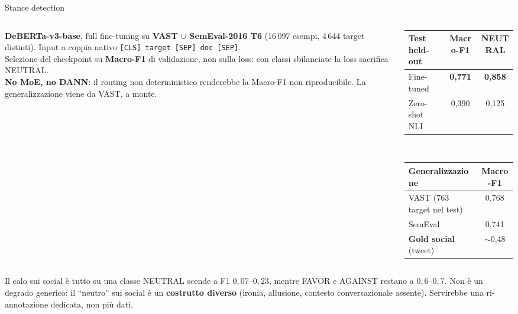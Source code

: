 \documentclass[aspectratio=169,11pt]{beamer}
\begin{document}
\begin{frame}{Stance detection}
  \begin{columns}[T]
    \begin{column}{0.5\textwidth}
      \footnotesize
      \textbf{DeBERTa-v3-base}, full fine-tuning su
      \textbf{VAST $\cup$ SemEval-2016 T6} (16\,097 esempi, \alert{4\,644 target distinti}).
      Input a coppia nativo \texttt{[CLS] target [SEP] doc [SEP]}.\\[0.4em]
      Selezione del checkpoint su \textbf{Macro-F1} di validazione, non sulla loss: con classi
      sbilanciate la loss sacrifica NEUTRAL.\\[0.4em]
      \textbf{No MoE, no DANN}: il routing non deterministico renderebbe la Macro-F1 non
      riproducibile. La generalizzazione viene da VAST, a monte.
    \end{column}
    \begin{column}{0.5\textwidth}
      \centering\small
      \begin{tabular}{lcc}
        \toprule
        \textbf{Test held-out} & \textbf{Macro-F1} & NEUTRAL \\
        \midrule
        Fine-tuned  & \textbf{0,771} & \textbf{0,858} \\
        Zero-shot NLI & 0,390 & 0,125 \\
        \bottomrule
      \end{tabular}\\[0.6em]
      \begin{tabular}{lc}
        \toprule
        \textbf{Generalizzazione} & Macro-F1 \\
        \midrule
        VAST (763 target nel test) & 0,768 \\
        SemEval & 0,741 \\
        \midrule
        \textbf{Gold social} (tweet) & \alert{$\sim$0,48} \\
        \bottomrule
      \end{tabular}
    \end{column}
  \end{columns}
  \vspace{0.5em}
  \begin{block}{\small Il calo sui social è tutto su una classe}
    \scriptsize
    NEUTRAL scende a F1 $0{,}07$--$0{,}23$, mentre FAVOR e AGAINST restano a
    $0{,}6$--$0{,}7$. Non è un degrado generico: il ``neutro'' sui social è un
    \textbf{costrutto diverso} (ironia, allusione, contesto conversazionale assente).
    Servirebbe una ri-annotazione dedicata, non più dati.
  \end{block}
\end{frame}
\end{document}
